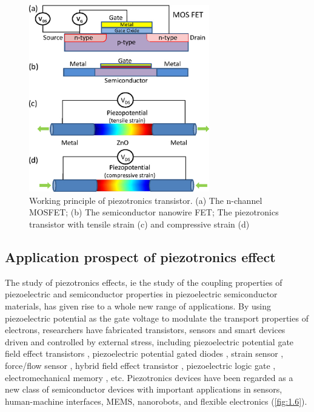 \begin{figure}[H] 
\centering    
\includegraphics[width=0.7\textwidth]{ch1_5}
\caption[Working principle of piezotronics transistor]{Working principle of piezotronics transistor. (a) The n-channel MOSFET; (b) The semiconductor nanowire FET; The piezotronics transistor with tensile strain (c) and compressive strain (d) \protect\cite{wang2012piezotronics}}
\label{fig:1.5}
\end{figure}

\subsection{Application prospect of piezotronics effect}

The study of piezotronics  effects, ie the study of the coupling properties of piezoelectric and semiconductor properties in piezoelectric semiconductor materials, has given rise to a whole new range of applications. By using piezoelectric potential  as the gate voltage  to modulate  the transport properties of electrons, researchers have fabricated transistors, sensors and smart devices driven and controlled by external stress, including piezoelectric potential  gate field effect transistors \cite{wang2006piezoelectric-nl}, piezoelectric potential  gated diodes \cite{he2007piezoelectric}, strain sensor \cite{zhou2008flexible}, force/flow sensor \cite{fei2009piezoelectric}, hybrid field effect transistor \cite{liu2010piezopotential}, piezoelectric logic gate \cite{wu2010strain}, electromechanical memory \cite{wu2011piezotronic}, etc. Piezotronics  devices have been regarded as a new class of semiconductor devices with important applications in sensors, human-machine interfaces, MEMS, nanorobots, and flexible electronics (\autoref{fig:1.6}).

